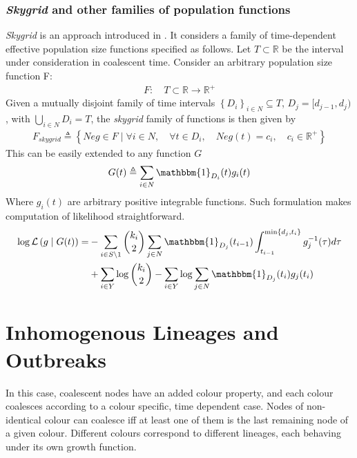 \documentclass{report}
\newcommand{\R}{\mathbb{R}}
\theoremstyle{definition}
\begin{document}
\subsubsection{\textit{Skygrid} and other families of population functions}
\textit{Skygrid} is an approach introduced in \cite{gill_improving_2013}. It considers a family of time-dependent effective population size functions specified as follows. Let $T\subset\R$ be the interval under consideration in coalescent time. Consider an arbitrary population size function F:
\begin{gather}
  F:\quad T\subset\R \rightarrow \R^+
\end{gather}
Given a mutually disjoint family of time intervals $\left\{D_i\right\}_{i\in N}\subseteq T$, $D_j = [d_{j-1}, d_{j})$,  with $\bigcup\limits_{i\in N} D_i = T$, the \textit{skygrid} family of functions is then given by 
\begin{gather}
F_{skygrid}\triangleq\left\{Neg\in F\mid\forall i\in N,\quad \forall t \in D_i,\quad Neg(t) = c_i,\quad c_i\in\R^+\right\}
\end{gather}
This can be easily extended to any function $G$
\begin{gather}
 G(t)\triangleq\sum_{i\in N}{\mathbbm{1}_{D_i}(t)g_i(t)}
\end{gather}
Where $g_i(t)$ are arbitrary positive integrable functions.
Such formulation makes computation of likelihood straightforward.
\begin{gather}
\begin{aligned}
\log\mathcal{L}\left(g\mid G(t)\right) 
=& -\sum_{i\in S\setminus 1}{
\binom{k_i}{2}\sum_{j\in N}{\mathbbm{1}_{D_j}(t_{i-1})
\int_{t_{i-1}}^{\min\{d_j, t_i\}}{g^{-1}_j(\tau)d\tau}}}\\
&+\sum_{i\in Y}{\log\binom{k_i}{2}} - \sum_{i\in Y}{\log{\sum_{j\in N}{\mathbbm{1}_{D_j}(t_i)g_j(t_i)}}}
\end{aligned}
\end{gather}
\section{Inhomogenous Lineages and Outbreaks}\label{section:multi}
In this case, coalescent nodes have an added colour property, and each colour coalesces according to a colour specific, time dependent case. Nodes of non-identical colour can coalesce iff at least one of them is the last remaining node of a given colour.
Different colours correspond to different lineages, each behaving under its own growth function.\\
\end{document}
